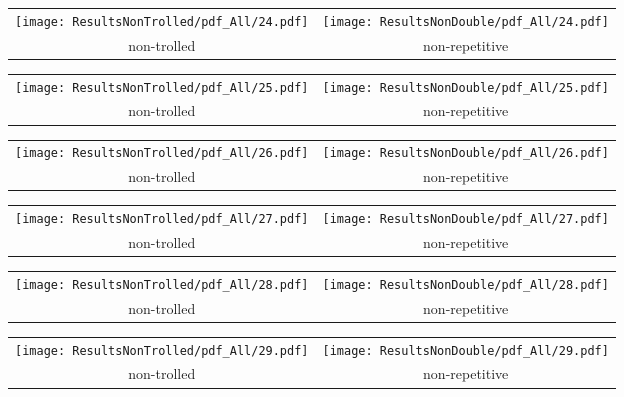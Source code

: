 \begin{tabular}{cc}
{  \texttt{[image: ResultsNonTrolled/pdf\_All/24.pdf]} } & 
{  \texttt{[image: ResultsNonDouble/pdf\_All/24.pdf]}} \\
 non-trolled & non-repetitive \\
\end{tabular}

\begin{tabular}{cc}
{  \texttt{[image: ResultsNonTrolled/pdf\_All/25.pdf]} } & 
{  \texttt{[image: ResultsNonDouble/pdf\_All/25.pdf]}} \\
 non-trolled & non-repetitive \\
\end{tabular}

\begin{tabular}{cc}
{  \texttt{[image: ResultsNonTrolled/pdf\_All/26.pdf]} } & 
{  \texttt{[image: ResultsNonDouble/pdf\_All/26.pdf]}} \\
 non-trolled & non-repetitive \\
\end{tabular}

\begin{tabular}{cc}
{  \texttt{[image: ResultsNonTrolled/pdf\_All/27.pdf]} } & 
{  \texttt{[image: ResultsNonDouble/pdf\_All/27.pdf]}} \\
 non-trolled & non-repetitive \\
\end{tabular}

\begin{tabular}{cc}
{  \texttt{[image: ResultsNonTrolled/pdf\_All/28.pdf]} } & 
{  \texttt{[image: ResultsNonDouble/pdf\_All/28.pdf]}} \\
 non-trolled & non-repetitive \\
\end{tabular}

\begin{tabular}{cc}
{  \texttt{[image: ResultsNonTrolled/pdf\_All/29.pdf]} } & 
{  \texttt{[image: ResultsNonDouble/pdf\_All/29.pdf]}} \\
 non-trolled & non-repetitive \\
\end{tabular}

